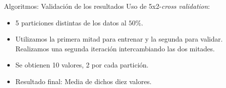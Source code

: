 \documentclass{beamer}
\begin{document}
\begin{frame}{Algoritmos: Validación de los resultados}
	Uso de 5x2-\textit{cross validation}:

	\begin{itemize}
		\item 5 particiones distintas de los datos al $50\%$.
		\item Utilizamos la primera mitad para entrenar y la segunda para validar. Realizamos una segunda iteración intercambiando las dos mitades.
		\item Se obtienen 10 valores, 2 por cada partición.
		\item Resultado final: Media de dichos diez valores.
	\end{itemize}

\end{frame}
\end{document}
